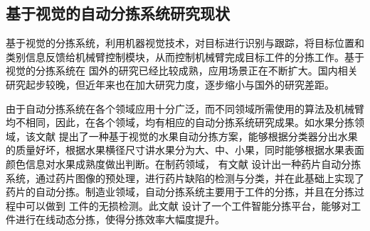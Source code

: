 \subsection{基于视觉的自动分拣系统研究现状}


基于视觉的分拣系统，利用机器视觉技术，对目标进行识别与跟踪，将目标位置和类别信息反馈给机械臂控制模块，从而控制机械臂完成目标工件的分拣工作。基于视觉的分拣系统在
国外的研究已经比较成熟，应用场景正在不断扩大。国内相关研究起步较晚，但近年来也在加大研究力度，逐步缩小与国外的研究差距。

由于自动分拣系统在各个领域应用十分广泛，而不同领域所需使用的算法及机械臂均不相同，因此，在各个领域，均有相应的自动分拣系统研究成果。如水果分拣领域，该文献  \cite{DT:2018}
提出了一种基于视觉的水果自动分拣方案，能够根据分类器分出水果的质量好坏，根据水果横径尺寸讲水果分为大、中、小果，同时能够根据水果表面颜色信息对水果成熟度做出判断。在制药领域，
有文献  \cite{YP2017}
设计出一种药片自动分拣系统，通过药片图像的预处理，进行药片缺陷的检测与分类，并在此基础上实现了药片的自动分拣。制造业领域，自动分拣系统主要用于工件的分拣，并且在分拣过程中可以做到
工件的无损检测。此文献  \cite{GJ2017}
设计了一个工件智能分拣平台，能够对工件进行在线动态分拣，使得分拣效率大幅度提升。

